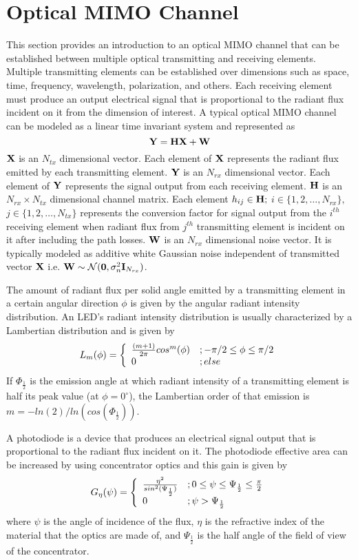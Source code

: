 \section{Optical MIMO Channel}\label{sec:mimo}
This section provides an introduction to an optical MIMO channel that can be established between multiple optical transmitting and receiving elements. Multiple transmitting elements can be established over dimensions such as space, time, frequency, wavelength, polarization, and others. Each receiving element must produce an output electrical signal that is proportional to the radiant flux incident on it from the dimension of interest. A typical optical MIMO channel can be modeled as a linear time invariant system and represented as
\begin{equation}
	\label{eqMIMOch}
	\vm{Y} = \vm{H}\vm{X} + \vm{W}
\end{equation}
${\bf{X}}$ is an $N_{tx}$ dimensional vector. Each element of ${\bf{X}}$ represents the radiant flux emitted by each transmitting element. ${\bf{Y}}$ is an $N_{rx}$ dimensional vector. Each element of ${\bf{Y}}$ represents the signal output from each receiving element. ${\bf{H}}$ is an $N_{rx}\times N_{tx}$ dimensional channel matrix. Each element $h_{ij}\in {\bf{H}};$ $i\in \{1,2,\dots, N_{rx}\},$ $j\in \{1,2,\dots, N_{tx}\}$ represents the conversion factor for signal output from the $i^{th}$ receiving element when radiant flux from $j^{th}$ transmitting element is incident on it after including the path losses. ${\bf{W}}$ is an $N_{rx}$ dimensional noise vector. It is typically modeled as additive white Gaussian noise independent of transmitted vector ${\bf{X}}$ i.e. ${\bf{W}}\sim\mathcal{N}({\bf{0}},\sigma_n^2{\bf{I}}_{N_{rx}})$.

The amount of radiant flux per solid angle emitted by a transmitting element in a certain angular direction $\phi$ is given by the angular radiant intensity distribution. An LED's radiant intensity distribution is usually characterized by a Lambertian distribution and is given by
\begin{equation}
	\label{eqLamb}
	L_m(\phi) = \twopartdef{{\frac{(m+1)}{2\pi}}cos^{m}(\phi)}{-\pi/2\leq\phi\leq\pi/2}{0}{\mbox{ else}}
\end{equation}
If $\Phi_{\frac{1}{2}}$ is the emission angle at which radiant intensity of a transmitting element is half its peak value (at $\phi=0^\circ$), the Lambertian order of that emission is $m=-ln(2)/ln(cos(\Phi_{\frac{1}{2}}))$.

A photodiode is a device that produces an electrical signal output that is proportional to the radiant flux incident on it. The photodiode effective area can be increased by using concentrator optics and this gain is given by
\begin{equation}
	\label{eqGain}
	G_{\eta}(\psi) = \twopartdef{\frac{\eta^2}{sin^2(\Psi_{\frac{1}{2}})}} {0\leq\psi\leq\Psi_{\frac{1}{2}}\leq\frac{\pi}{2}}{0}{\psi>\Psi_{\frac{1}{2}}}
\end{equation}
where $\psi$ is the angle of incidence of the flux, $\eta$ is the refractive index of the material that the optics are made of, and $\Psi_{\frac{1}{2}}$ is the half angle of the field of view of the concentrator.

